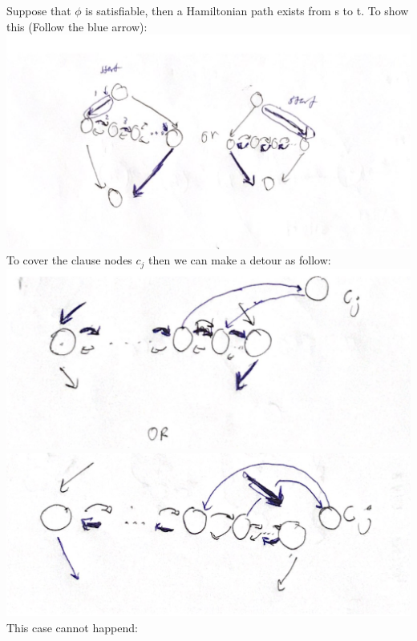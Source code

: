 \documentclass[a4paper, 11pt]{article}
\begin{document}
Suppose that $\phi$ is satisfiable, then a Hamiltonian path exists from s to t. To show this (Follow the blue arrow):\\
\includegraphics[width=\textwidth]{Q4-2.png}\\
To cover the clause nodes $c_j$ then we can make a detour as follow:\\
\includegraphics[width=\textwidth]{Q4-4.png}\\
\includegraphics[width=\textwidth]{Q4-6.png}\\
This case cannot happend:\\
\end{document}
